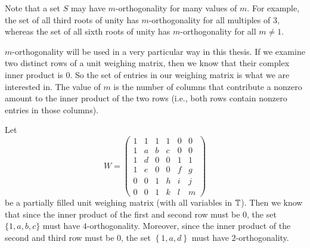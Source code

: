 % 
% 
% 

Note that a set $S$ may have $m$-orthogonality for many values of $m$. For example, the set of all third roots of unity has $m$-orthogonality for all multiples of 3, whereas the set of all sixth roots of unity has $m$-orthogonality for all $m \neq 1$.


$m$-orthogonality will be used in a very particular way in this thesis. If we examine two distinct rows of a unit weighing matrix, then we know that their complex inner product is 0. So the set of entries in our weighing matrix is what we are interested in. The value of $m$ is the number of columns that contribute a nonzero amount to the inner product of the two rows (i.e., both rows contain nonzero entries in those columns).

\begin{example} \label{ex:m-orth}
 Let $$W = \left(\begin{array}{cccccc}
                   1 & 1 & 1 & 1 & 0 & 0 \\
                   1 & a & b & c & 0 & 0 \\
                   1 & d & 0 & 0 & 1 & 1 \\
                   1 & e & 0 & 0 & f & g \\
                   0 & 0 & 1 & h & i & j \\
                   0 & 0 & 1 & k & l & m
                  \end{array}\right)$$
 be a partially filled unit weighing matrix (with all variables in $\mathbb{T}$). Then we know that since the inner product of the first and second row must be 0, the set $\{1,a,b,c\}$ must have $4$-orthogonality. Moreover, since the inner product of the second and third row must be 0, the set $\left\{1,a,d\right\}$ must have $2$-orthogonality.
\end{example}

